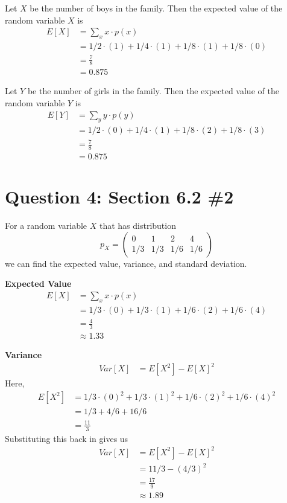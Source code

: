 \documentclass[11pt, oneside]{article}   	%
\begin{document}
\cleardoublepage
Let $X$ be the number of boys in the family. Then the expected value of the random variable $X$ is
\begin{align*}
	E[X] &= \sum_x x \cdot p(x) \\
	& = 1/2 \cdot (1) + 1/4 \cdot (1) + 1/8 \cdot (1) + 1/8 \cdot (0) \\
	& = \frac{7}{8}\\
	& = 0.875 
\end{align*}

Let $Y$ be the number of girls in the family. Then the expected value of the random variable $Y$ is
\begin{align*}
	E[Y] &= \sum_y y \cdot p(y) \\
	& = 1/2 \cdot (0) + 1/4 \cdot (1) + 1/8 \cdot (2) + 1/8 \cdot (3) \\
	& = \frac{7}{8}\\
	& = 0.875
\end{align*}

\cleardoublepage
\section*{Question 4: Section 6.2 \#2}

For a random variable $X$ that has distribution
$$p_X = 
\begin{pmatrix}					%
	0 & 1 & 2 & 4 \\
	1/3 & 1/3 & 1/6 & 1/6
\end{pmatrix}$$
we can find the expected value, variance, and standard deviation.

\textbf{Expected Value}
\begin{align*}
	E[X] & = \sum_x x \cdot p(x) \\
	& = 1/3\cdot(0) + 1/3 \cdot (1) + 1/6 \cdot (2) + 1/6 \cdot (4) \\
	& = \frac{4}{3} \\
	& \approx 1.33
\end{align*}

\textbf{Variance}
\begin{align*}
	Var[X] & = E[X^2]-E[X]^2
\end{align*}
Here,
\begin{align*}
	E[X^2] & = 1/3 \cdot (0)^2 + 1/3 \cdot (1)^2+ 1/6 \cdot (2)^2 + 1/6 \cdot (4)^2 \\
	& = 1/3 + 4/6 + 16/6 \\
	& = \frac{11}{3}
\end{align*}
Substituting this back in gives us
\begin{align*}
	Var[X] & = E[X^2]-E[X]^2 \\
	& = 11/3 - (4/3)^2 \\
	& = \frac{17}{9} \\
	& \approx 1.89
\end{align*}
\end{document}
